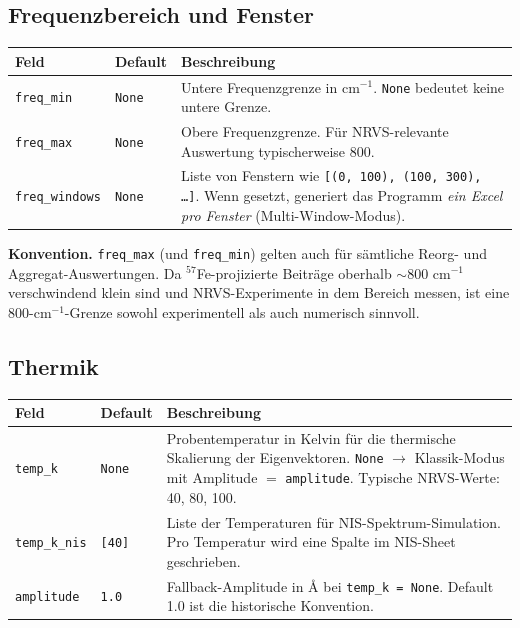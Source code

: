 \documentclass[11pt,a4paper,twoside]{article}
\theoremstyle{remark}
\begin{document}
\subsection{Frequenzbereich und Fenster}

\begin{longtable}{p{} p{} p{}}
\toprule
\textbf{Feld} & \textbf{Default} & \textbf{Beschreibung} \\
\midrule
\endhead
\texttt{freq\_min}      & \texttt{None} & Untere Frequenzgrenze in
  cm$^{-1}$. \texttt{None} bedeutet keine untere Grenze. \\
\texttt{freq\_max}      & \texttt{None} & Obere Frequenzgrenze.
  F\"ur NRVS-relevante Auswertung typischerweise 800. \\
\texttt{freq\_windows}  & \texttt{None} & Liste von Fenstern wie
  \texttt{[(0, 100), (100, 300), \ldots]}. Wenn gesetzt, generiert das
  Programm \emph{ein Excel pro Fenster} (Multi-Window-Modus). \\
\bottomrule
\end{longtable}

\begin{infobox}
\textbf{Konvention.} \texttt{freq\_max} (und \texttt{freq\_min}) gelten
auch f\"ur s\"amtliche Reorg- und Aggregat-Auswertungen. Da
$^{57}$Fe-projizierte Beitr\"age oberhalb $\sim$800 cm$^{-1}$
verschwindend klein sind und NRVS-Experimente in dem Bereich messen,
ist eine 800-cm$^{-1}$-Grenze sowohl experimentell als auch numerisch
sinnvoll.
\end{infobox}

\subsection{Thermik}

\begin{longtable}{p{} p{} p{}}
\toprule
\textbf{Feld} & \textbf{Default} & \textbf{Beschreibung} \\
\midrule
\endhead
\texttt{temp\_k}       & \texttt{None} & Probentemperatur in Kelvin
  f\"ur die thermische Skalierung der Eigenvektoren. \texttt{None}
  $\to$ Klassik-Modus mit Amplitude $=$ \texttt{amplitude}. Typische
  NRVS-Werte: 40, 80, 100. \\
\texttt{temp\_k\_nis}  & \texttt{[40]} & Liste der Temperaturen f\"ur
  NIS-Spektrum-Simulation. Pro Temperatur wird eine Spalte im NIS-Sheet
  geschrieben. \\
\texttt{amplitude}      & \texttt{1.0}  & Fallback-Amplitude in
  \AA{} bei \texttt{temp\_k = None}. Default 1.0 ist die historische
  Konvention. \\
\bottomrule
\end{longtable}
\end{document}
